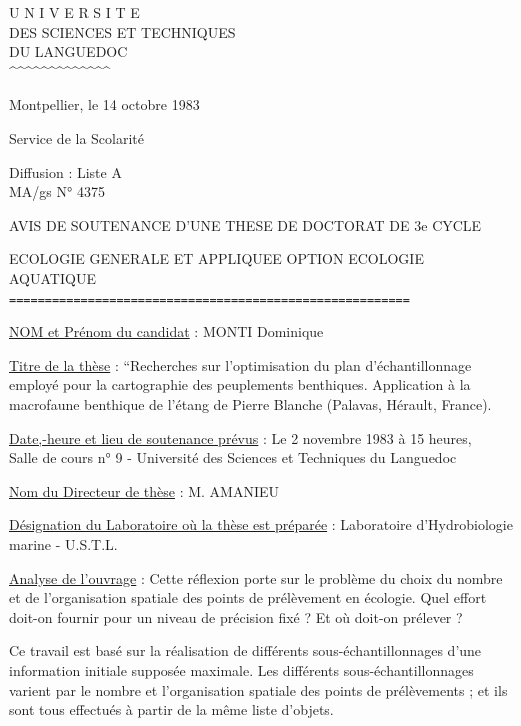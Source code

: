 
\begin{center}
U N I V E R S I T E\\
DES SCIENCES ET TECHNIQUES\\
DU LANGUEDOC\\
\textasciicircum\textasciicircum\textasciicircum\textasciicircum\textasciicircum\textasciicircum\textasciicircum\textasciicircum\textasciicircum\textasciicircum\textasciicircum\textasciicircum\textasciicircum
\end{center}

Montpellier, le 14 octobre 1983

Service de la Scolarité

Diffusion : Liste A\\
MA/gs \hfill N° 4375

\begin{center}
AVIS DE SOUTENANCE D'UNE THESE DE DOCTORAT DE 3e CYCLE

ECOLOGIE GENERALE ET APPLIQUEE OPTION ECOLOGIE AQUATIQUE\\
\texttt{========================================================}
\end{center}

\uline{NOM et Prénom du candidat} : MONTI Dominique

\uline{Titre de la thèse} : ``Recherches sur l'optimisation du plan d'échantillonnage employé pour la cartographie des peuplements benthiques. Application à la macrofaune benthique de l'étang de Pierre Blanche (Palavas, Hérault, France).

\uline{Date,-heure et lieu de soutenance prévus} : Le 2 novembre 1983 à 15 heures,\\
Salle de cours n° 9 - Université des Sciences et Techniques du Languedoc

\uline{Nom du Directeur de thèse} : M. AMANIEU

\uline{Désignation du Laboratoire où la thèse est préparée} : Laboratoire d'Hydrobiologie marine - U.S.T.L.

\uline{Analyse de l'ouvrage} : Cette réflexion porte sur le problème du choix du nombre et de l'organisation spatiale des points de prélèvement en écologie. Quel effort doit-on fournir pour un niveau de précision fixé ? Et où doit-on prélever ?

Ce travail est basé sur la réalisation de différents sous-échantillonnages d'une information initiale supposée maximale. Les différents sous-échantillonnages varient par le nombre et l'organisation spatiale des points de prélèvements ; et ils sont tous effectués à partir de la même liste d'objets.

